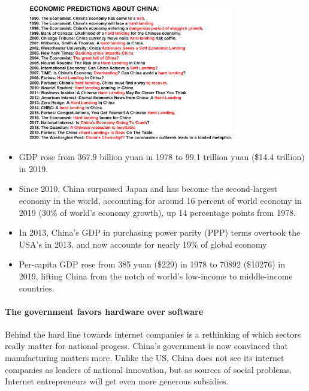 \begin{figure}[h]
    \centering
    \includegraphics[width=0.8\textwidth]{Pictures/China_economic_prediction.png}
\end{figure}

\begin{itemize}
    \item GDP rose from $367.9$ billion yuan in 1978 to 99.1 trillion yuan
        (\$14.4 trillion) in 2019.
    \item Since 2010, China surpassed Japan and has become the second-largest
        economy in the world, accounting for around 16 percent of world economy
        in 2019 (30\% of world's economy growth), up 14 percentage points from
        1978.
    \item In 2013, China's GDP in purchasing power parity (PPP) terms overtook
        the USA's in 2013, and now accounts for nearly 19\% of global economy
    \item Per-capita GDP rose from 385 yuan (\$229) in 1978 to 70892 (\$10276)
        in 2019, lifting China from the notch of world's low-income to
        middle-income countries.
\end{itemize}

\paragraph{The government favors hardware over software}

Behind the hard line towards internet companies is a rethinking of which
sectors really matter for national progess. China's government is now convinced
that manufacturing matters more. Unlike the US, China does not see its internet
companies as leaders of national innovation, but as sources of social problems.
Internet entrepreneurs will get even more generous subsidies.

